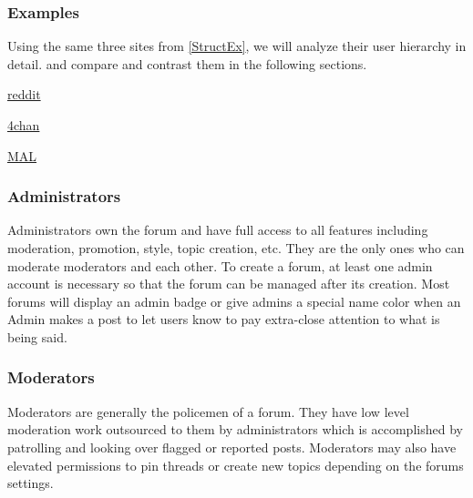 \documentclass[]{article}
\begin{document}
\newpage
\subsubsection{Examples}
Using the same three sites from \ref{StructEx}, we will analyze their user hierarchy in detail. and compare and contrast them in the following sections.

\vspace{0.2 cm}
\begin{minipage}{0.4\textwidth}
\hspace{0.3cm}
\href{https://www.reddit.com/}{reddit}
\vspace{0.2 cm}
\end{minipage}%
\vline
\begin{minipage}{0.23\textwidth}
\hspace{0.3cm}
\href{https://www.4channel.org/}{4chan}
\vspace{0.2 cm}
\end{minipage}%
\vline
\begin{minipage}{0.4\textwidth}
\hspace{0.3cm}
\href{https://myanimelist.net/}{MAL}
\vspace{0.2 cm}
\end{minipage}%

\subsubsection{Administrators}
Administrators own the forum and have full access to all features including moderation, promotion, style, topic creation, etc. They are the only ones who can moderate moderators and each other. To create a forum, at least one admin account is necessary so that the forum can be managed after its creation. Most forums will display an admin badge or give admins a special name color when an Admin makes a post to let users know to pay extra-close attention to what is being said.    

\subsubsection{Moderators}
Moderators are generally the policemen of a forum. They have low level moderation work outsourced to them by administrators which is accomplished by patrolling and looking over flagged or reported posts. Moderators may also have elevated permissions to pin threads or create new topics depending on the forums settings.
\end{document}
